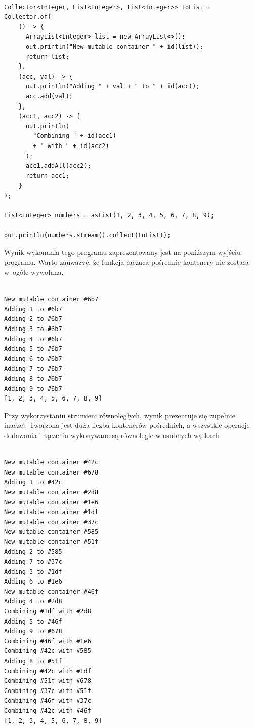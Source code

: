 \documentclass[12pt,twoside,openright]{extarticle}
\begin{document}
\begin{lstlisting}[label=toList, caption=Ręczna implementacja \texttt{toList}]

Collector<Integer, List<Integer>, List<Integer>> toList =
Collector.of(
    () -> {
      ArrayList<Integer> list = new ArrayList<>();
      out.println("New mutable container " + id(list));
      return list;
    },
    (acc, val) -> {
      out.println("Adding " + val + " to " + id(acc));
      acc.add(val);
    },
    (acc1, acc2) -> {
      out.println(
        "Combining " + id(acc1)
        + " with " + id(acc2)
      );
      acc1.addAll(acc2);
      return acc1;
    }
);

List<Integer> numbers = asList(1, 2, 3, 4, 5, 6, 7, 8, 9);

out.println(numbers.stream().collect(toList));

\end{lstlisting}

Wynik wykonania tego programu zaprezentowany jest na poniższym wyjściu programu. Warto zauważyć, że funkcja łącząca pośrednie kontenery nie została w~ogóle wywołana. 
    
\begin{verbatim}

New mutable container #6b7
Adding 1 to #6b7
Adding 2 to #6b7
Adding 3 to #6b7
Adding 4 to #6b7
Adding 5 to #6b7
Adding 6 to #6b7
Adding 7 to #6b7
Adding 8 to #6b7
Adding 9 to #6b7
[1, 2, 3, 4, 5, 6, 7, 8, 9]

\end{verbatim}

Przy wykorzystaniu strumieni równoległych, wynik prezentuje się zupełnie inaczej. Tworzona jest duża liczba kontenerów pośrednich, a wszystkie operacje dodawania i łączenia wykonywane są równolegle w osobnych wątkach.

\begin{verbatim}

New mutable container #42c
New mutable container #678
Adding 1 to #42c
New mutable container #2d8
New mutable container #1e6
New mutable container #1df
New mutable container #37c
New mutable container #585
New mutable container #51f
Adding 2 to #585
Adding 7 to #37c
Adding 3 to #1df
Adding 6 to #1e6
New mutable container #46f
Adding 4 to #2d8
Combining #1df with #2d8
Adding 5 to #46f
Adding 9 to #678
Combining #46f with #1e6
Combining #42c with #585
Adding 8 to #51f
Combining #42c with #1df
Combining #51f with #678
Combining #37c with #51f
Combining #46f with #37c
Combining #42c with #46f
[1, 2, 3, 4, 5, 6, 7, 8, 9]

\end{verbatim}
\end{document}
